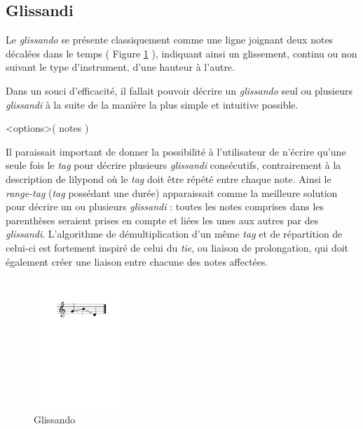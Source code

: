 \documentclass{article}
\newenvironment{gmncode}	{\vspace{-2mm}\small\verbatim}{\endverbatim\vspace{-2mm}}
\begin{document}
\subsection{Glissandi}\label{subsec:glissando}

Le \emph{glissando} se présente classiquement comme une ligne joignant deux notes décalées dans le temps ( Figure \ref{fig:glissandoSimple} ), indiquant ainsi un glissement, continu ou non suivant le type d'instrument, d'une hauteur à l'autre.

Dans un souci d'efficacité, il fallait pouvoir décrire un \emph{glissando} seul ou plusieurs \emph{glissandi} à la suite de la manière la plus simple et intuitive possible. 

\begin{gmncode}
\glissando<options>( notes )
\end{gmncode}

Il paraissait important de donner la possibilité à l'utilisateur de n'écrire qu'une seule fois le \emph{tag} pour décrire plusieurs \emph{glissandi} consécutifs, contrairement à la description de lilypond où le \emph{tag} doit être répété entre chaque note. Ainsi le \emph{range-tag} (\emph{tag} possédant une durée) apparaissait comme la meilleure solution pour décrire un ou plusieurs \emph{glissandi} : toutes les notes comprises dans les parenthèses seraient prises en compte et liées les unes aux autres par des \emph{glissandi}. L'algorithme de démultiplication d'un même \emph{tag} et de répartition de celui-ci est fortement inspiré de celui du \emph{tie}, ou liaison de prolongation, qui doit également créer une liaison entre chacune des notes affectées.
\\

\begin{figure}[h]
\centering

\begin{gmncode}
[ \glissando( g b d ) ]
\end{gmncode}

\includegraphics[width=35mm]{img/glissando1.pdf}
\caption{Glissando}
\label{fig:glissandoSimple}
\end{figure}
\end{document}
